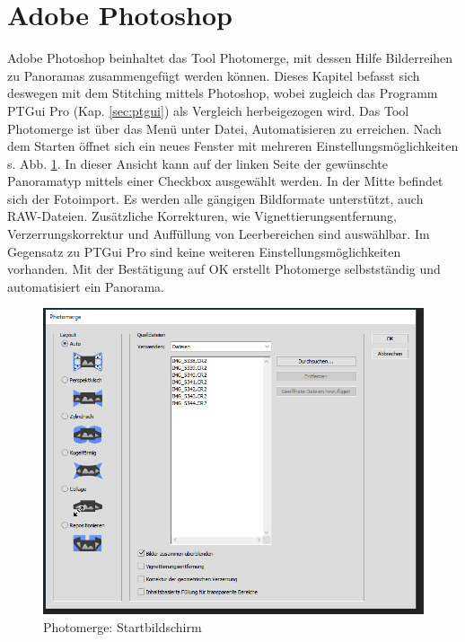 \documentclass[liststotoc,bibtotoc,fontsize=14pt,]{scrreprt}
\begin{document}
	\section{Adobe Photoshop}
	\label{sec:photoshop}
	Adobe Photoshop beinhaltet das Tool \grqq{}Photomerge\grqq{}, mit dessen Hilfe Bilderreihen zu Panoramas zusammengefügt werden können. Dieses Kapitel befasst sich deswegen mit dem Stitching mittels Photoshop, wobei zugleich das Programm PTGui Pro (Kap. \ref{sec:ptgui}) als Vergleich herbeigezogen wird.
	\bigskip
	Das Tool Photomerge ist über das Menü unter Datei, Automatisieren zu erreichen. Nach dem Starten öffnet sich ein neues Fenster mit mehreren Einstellungsmöglichkeiten s. Abb. \ref{img:photoshop_step_2}.
	In dieser Ansicht kann auf der linken Seite der gewünschte Panoramatyp mittels einer Checkbox ausgewählt werden. In der Mitte befindet sich der Fotoimport. Es werden alle gängigen Bildformate unterstützt, auch RAW-Dateien. Zusätzliche Korrekturen, wie Vignettierungsentfernung, Verzerrungskorrektur und Auffüllung von Leerbereichen sind auswählbar. Im Gegensatz zu PTGui Pro sind keine weiteren Einstellungsmöglichkeiten vorhanden. Mit der Bestätigung auf \grqq{}OK\grqq{} erstellt Photomerge selbstständig und automatisiert ein Panorama.
	\begin{figure}[H]
		\includegraphics[width=\linewidth]{img/steps/Photoshop_Step_2.png}
		\caption{Photomerge: Startbildschirm}
		\label{img:photoshop_step_2}
	\end{figure}
	\bigskip
\end{document}

